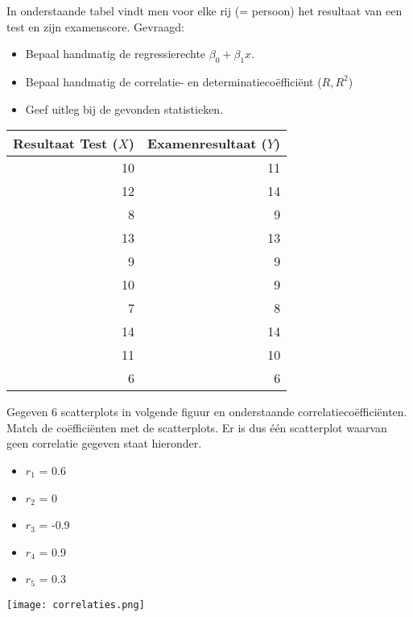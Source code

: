 \begin{exercise}
	\label{ex:test-examen}
	In onderstaande tabel vindt men voor elke rij (= persoon) het resultaat van een test en zijn examenscore. Gevraagd:
\begin{itemize}
	\item Bepaal handmatig de regressierechte $\beta_{0} + \beta_{1} x$. 
	\item Bepaal handmatig de correlatie- en determinatieco\"effici\"ent ($R, R^{2}$) 
	\item Geef uitleg bij de gevonden statistieken.
\end{itemize}

	\centering
	\begin{tabular}{@{}rr@{}} \toprule
	Resultaat Test ($X$) & Examenresultaat ($Y$) \\
		\midrule
		10 & 11 \\
		12 & 14 \\
		8 & 9 \\
		13 & 13 \\
		9 & 9 \\
		10 &  9 \\
		7 & 8 \\
		14 & 14 \\
		11 & 10 \\
		6 & 6  \\
		\bottomrule
	\end{tabular}
	\label{tab:testExamen}
\end{exercise}

\begin{exercise}
  \label{ex:scatter-correlatiecoeff}
	Gegeven 6 scatterplots in volgende figuur en onderstaande correlatieco\"effici\"enten. Match de co\"effici\"enten met de scatterplots. Er is dus één scatterplot waarvan geen correlatie gegeven staat hieronder.
\begin{itemize}
	\item $r_{1}$ = 0.6
	\item $r_{2}$ = 0
	\item $r_{3}$ = -0.9
	\item $r_{4}$ = 0.9
	\item $r_{5}$ = 0.3
\end{itemize}
	\texttt{[image: correlaties.png]}
	\label{fig:correlaties}
\end{exercise}

